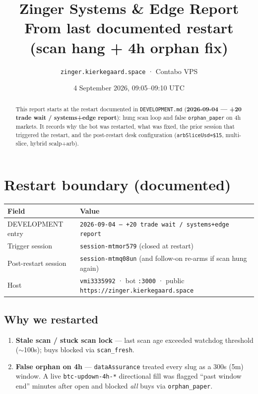 \documentclass[11pt,a4paper]{article}
\title{\textbf{Zinger Systems \& Edge Report}\\[0.35em]
\large From last documented restart (scan hang + 4h orphan fix)}
\author{\texttt{zinger.kierkegaard.space} · Contabo VPS}
\date{4 September 2026, 09:05--09:10 UTC}
\begin{document}
\maketitle
\thispagestyle{fancy}

\begin{abstract}
\noindent
This report starts at the restart documented in \texttt{DEVELOPMENT.md}
(\textbf{2026-09-04 --- +20 trade wait / systems+edge report}): hung scan loop and
false \texttt{orphan\_paper} on 4h markets. It records why the bot was restarted,
what was fixed, the prior session that triggered the restart, and the post-restart
desk configuration (\texttt{arbSliceUsd=\$15}, multi-slice, hybrid scalp+arb).
\end{abstract}

\section{Restart boundary (documented)}
\begin{table}[h]
\centering
\begin{tabular}{@{}lp{10cm}@{}}
\toprule
\textbf{Field} & \textbf{Value} \\
\midrule
DEVELOPMENT entry & \texttt{2026-09-04 --- +20 trade wait / systems+edge report} \\
Trigger session & \texttt{session-mtmor579} (closed at restart) \\
Post-restart session & \texttt{session-mtmq08un} (and follow-on re-arms if scan hung again) \\
Host & \texttt{vmi3335992} · bot \texttt{:3000} · public \texttt{https://zinger.kierkegaard.space} \\
\bottomrule
\end{tabular}
\end{table}

\subsection{Why we restarted}
\begin{enumerate}[leftmargin=*,itemsep=0.35em]
  \item \textbf{Stale scan / stuck scan lock} --- last scan age exceeded watchdog threshold ($\sim$100s); buys blocked via \texttt{scan\_fresh}.
  \item \textbf{False orphan on 4h} --- \texttt{dataAssurance} treated every slug as a 300s (5m) window. A live \texttt{btc-updown-4h-*} directional fill was flagged ``past window end'' minutes after open and blocked \emph{all} buys via \texttt{orphan\_paper}.
\end{enumerate}
\end{document}

